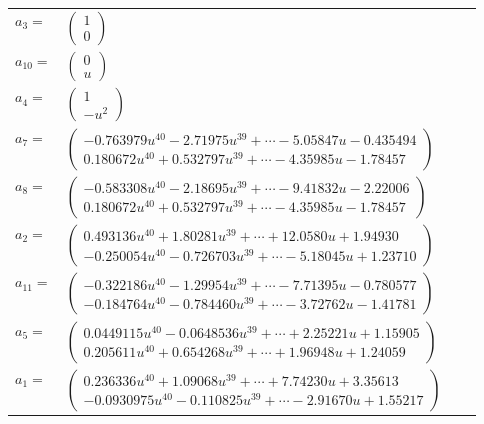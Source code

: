 \documentclass[1p]{elsarticle_modified}
\theoremstyle{definition}
\begin{document}
\begin{tabular}{m{7pt} m{180pt} m{7pt} m{180pt} }
\flushright $a_{3}=$&$\begin{pmatrix}1\\0\end{pmatrix}$ \\
\flushright $a_{10}=$&$\begin{pmatrix}0\\u\end{pmatrix}$ \\
\flushright $a_{4}=$&$\begin{pmatrix}1\\- u^2\end{pmatrix}$ \\
\flushright $a_{7}=$&$\begin{pmatrix}-0.763979 u^{40}-2.71975 u^{39}+\cdots-5.05847 u-0.435494\\0.180672 u^{40}+0.532797 u^{39}+\cdots-4.35985 u-1.78457\end{pmatrix}$ \\
\flushright $a_{8}=$&$\begin{pmatrix}-0.583308 u^{40}-2.18695 u^{39}+\cdots-9.41832 u-2.22006\\0.180672 u^{40}+0.532797 u^{39}+\cdots-4.35985 u-1.78457\end{pmatrix}$ \\
\flushright $a_{2}=$&$\begin{pmatrix}0.493136 u^{40}+1.80281 u^{39}+\cdots+12.0580 u+1.94930\\-0.250054 u^{40}-0.726703 u^{39}+\cdots-5.18045 u+1.23710\end{pmatrix}$ \\
\flushright $a_{11}=$&$\begin{pmatrix}-0.322186 u^{40}-1.29954 u^{39}+\cdots-7.71395 u-0.780577\\-0.184764 u^{40}-0.784460 u^{39}+\cdots-3.72762 u-1.41781\end{pmatrix}$ \\
\flushright $a_{5}=$&$\begin{pmatrix}0.0449115 u^{40}-0.0648536 u^{39}+\cdots+2.25221 u+1.15905\\0.205611 u^{40}+0.654268 u^{39}+\cdots+1.96948 u+1.24059\end{pmatrix}$ \\
\flushright $a_{1}=$&$\begin{pmatrix}0.236336 u^{40}+1.09068 u^{39}+\cdots+7.74230 u+3.35613\\-0.0930975 u^{40}-0.110825 u^{39}+\cdots-2.91670 u+1.55217\end{pmatrix}$ \\

\end{tabular}
\end{document}

